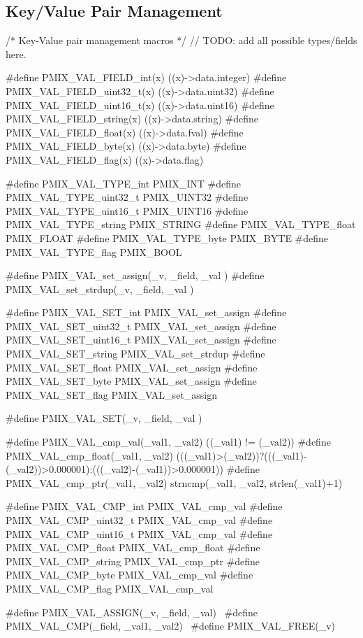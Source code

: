 \subsection{Key/Value Pair Management}


\cspecificstart
\begin{codepar}
/* Key-Value pair management macros */
// TODO: add all possible types/fields here.

#define PMIX_VAL_FIELD_int(x)       ((x)->data.integer)
#define PMIX_VAL_FIELD_uint32_t(x)  ((x)->data.uint32)
#define PMIX_VAL_FIELD_uint16_t(x)  ((x)->data.uint16)
#define PMIX_VAL_FIELD_string(x)    ((x)->data.string)
#define PMIX_VAL_FIELD_float(x)     ((x)->data.fval)
#define PMIX_VAL_FIELD_byte(x)      ((x)->data.byte)
#define PMIX_VAL_FIELD_flag(x)      ((x)->data.flag)

#define PMIX_VAL_TYPE_int      PMIX_INT
#define PMIX_VAL_TYPE_uint32_t PMIX_UINT32
#define PMIX_VAL_TYPE_uint16_t PMIX_UINT16
#define PMIX_VAL_TYPE_string   PMIX_STRING
#define PMIX_VAL_TYPE_float    PMIX_FLOAT
#define PMIX_VAL_TYPE_byte     PMIX_BYTE
#define PMIX_VAL_TYPE_flag     PMIX_BOOL
\end{codepar}
\cspecificend


\cspecificstart
\begin{codepar}

#define PMIX_VAL_set_assign(_v, _field, _val )
#define PMIX_VAL_set_strdup(_v, _field, _val )

#define PMIX_VAL_SET_int        PMIX_VAL_set_assign
#define PMIX_VAL_SET_uint32_t   PMIX_VAL_set_assign
#define PMIX_VAL_SET_uint16_t   PMIX_VAL_set_assign
#define PMIX_VAL_SET_string     PMIX_VAL_set_strdup
#define PMIX_VAL_SET_float      PMIX_VAL_set_assign
#define PMIX_VAL_SET_byte       PMIX_VAL_set_assign
#define PMIX_VAL_SET_flag       PMIX_VAL_set_assign

#define PMIX_VAL_SET(_v, _field, _val )
\end{codepar}
\cspecificend


\cspecificstart
\begin{codepar}

#define PMIX_VAL_cmp_val(_val1, _val2)      ((_val1) != (_val2))
#define PMIX_VAL_cmp_float(_val1, _val2)    (((_val1)>(_val2))?(((_val1)-(_val2))>0.000001):(((_val2)-(_val1))>0.000001))
#define PMIX_VAL_cmp_ptr(_val1, _val2)      strncmp(_val1, _val2, strlen(_val1)+1)

#define PMIX_VAL_CMP_int        PMIX_VAL_cmp_val
#define PMIX_VAL_CMP_uint32_t   PMIX_VAL_cmp_val
#define PMIX_VAL_CMP_uint16_t   PMIX_VAL_cmp_val
#define PMIX_VAL_CMP_float      PMIX_VAL_cmp_float
#define PMIX_VAL_CMP_string     PMIX_VAL_cmp_ptr
#define PMIX_VAL_CMP_byte       PMIX_VAL_cmp_val
#define PMIX_VAL_CMP_flag       PMIX_VAL_cmp_val
\end{codepar}
\cspecificend


\cspecificstart
\begin{codepar}

#define PMIX_VAL_ASSIGN(_v, _field, _val) \
#define PMIX_VAL_CMP(_field, _val1, _val2) \
#define PMIX_VAL_FREE(_v) \
\end{codepar}
\cspecificend


